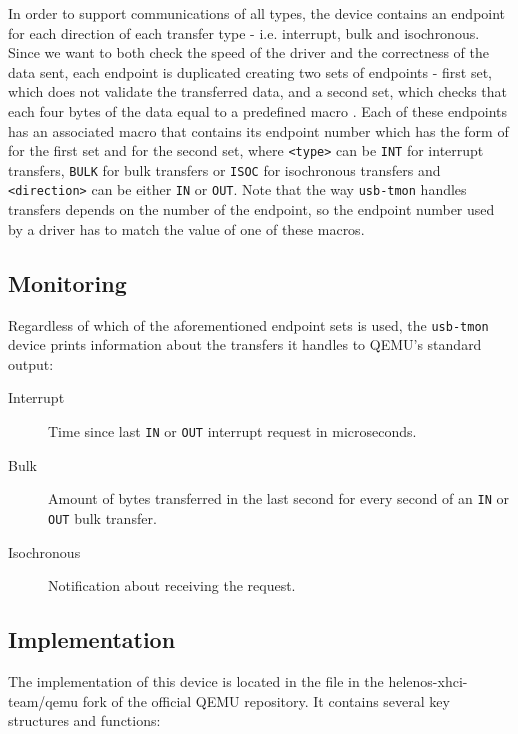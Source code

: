 In order to support communications of all types, the device contains an
endpoint for each direction of each transfer type - i.e. interrupt, bulk and
isochronous. Since we want to both check the speed of the driver and the
correctness of the data sent, each endpoint is duplicated creating two
sets of endpoints - first set, which does not validate the transferred data,
and a second set, which checks that each four bytes of the data equal to a
predefined macro . Each of these endpoints has an associated
macro that contains its endpoint number which has the form of
 for the first set and
 for the second set, where \texttt{<type>}
can be \texttt{INT} for interrupt transfers, \texttt{BULK} for bulk transfers or
\texttt{ISOC} for isochronous transfers and \texttt{<direction>} can be either
\texttt{IN} or \texttt{OUT}. Note that the way \texttt{usb-tmon} handles
transfers depends on the number of the endpoint, so the endpoint number used
by a driver has to match the value of one of these macros.

\subsection{Monitoring}

Regardless of which of the aforementioned endpoint sets is used, the
\texttt{usb-tmon} device prints information about the transfers it handles
to QEMU's standard output:
~
\begin{description}
	\item[Interrupt]
		Time since last \texttt{IN} or \texttt{OUT} interrupt request in
		microseconds.
	\item[Bulk]
		Amount of bytes transferred in the last second for every second of an
		\texttt{IN} or \texttt{OUT} bulk transfer.
	\item[Isochronous]
		Notification about receiving the request.
\end{description}

\subsection{Implementation}

The implementation of this device is located in the file
 in the helenos-xhci-team/qemu fork of
the official QEMU repository. It contains several key structures and functions:

